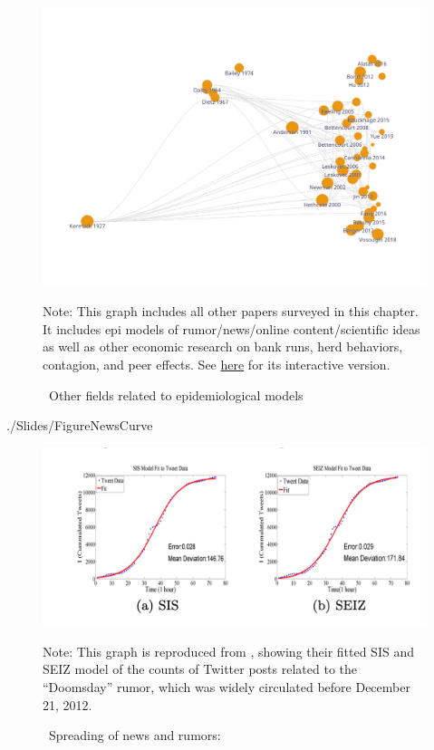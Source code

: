 \begin{figure}[!ht] \centering  %
	\caption{ ~Other fields related to epidemiological models}
	\label{fig:graph_other}
	\centerline{\includegraphics[width=\textwidth]{./figures/graph_other}}
				\begin{flushleft}{\footnotesize Note: This graph includes all other papers surveyed in this chapter. It includes epi models of rumor/news/online content/scientific ideas as well as other economic research on bank runs, herd behaviors, contagion, and peer effects. See \href{https://app.litmaps.co/shared/B5FA1F14-01A8-4C9D-BF23-BE0F62293FAF}{here} for its interactive version.}
						\end{flushleft}
\end{figure}


\newpage


\begin{verbatimwrite}{./Slides/FigureNewsCurve}
\begin{figure}[!ht] \centering  %
	\caption{ ~Spreading of news and rumors: \href{https://people.cs.vt.edu/ramakris/papers/news-rumor-epi-snakdd13.pdf}{\cite{jin2013epidemiological}}}
	\label{fig:news_curve}
	\centerline{\includegraphics[width=\textwidth]{./figures/Doomsday.png}}
		\begin{flushleft}{\footnotesize Note: This graph is reproduced from \cite{jin2013epidemiological}, showing their fitted SIS and SEIZ model of the counts of Twitter posts related to the ``Doomsday'' rumor, which was widely circulated before December 21, 2012.}
	\end{flushleft}
\end{figure}
\end{verbatimwrite}%


